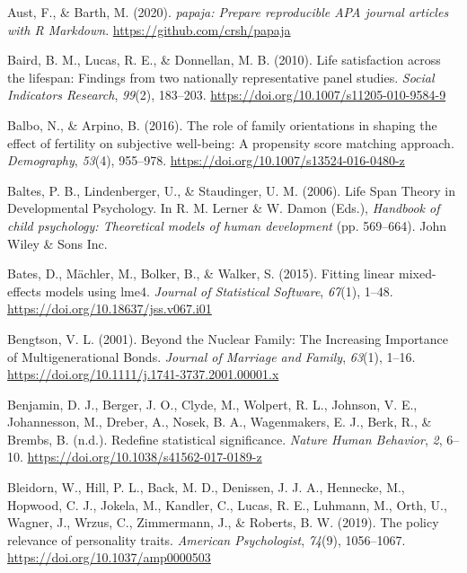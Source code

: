 \documentclass[
  english,
  man, noextraspace]{apa7}
\begin{document}
\leavevmode\hypertarget{ref-R-papaja}{}%
Aust, F., \& Barth, M. (2020). \emph{papaja: Prepare reproducible APA journal articles with R Markdown}. \url{https://github.com/crsh/papaja}

\leavevmode\hypertarget{ref-bairdLifeSatisfactionLifespan2010}{}%
Baird, B. M., Lucas, R. E., \& Donnellan, M. B. (2010). Life satisfaction across the lifespan: Findings from two nationally representative panel studies. \emph{Social Indicators Research}, \emph{99}(2), 183--203. \url{https://doi.org/10.1007/s11205-010-9584-9}

\leavevmode\hypertarget{ref-balboRoleFamilyOrientations2016}{}%
Balbo, N., \& Arpino, B. (2016). The role of family orientations in shaping the effect of fertility on subjective well-being: A propensity score matching approach. \emph{Demography}, \emph{53}(4), 955--978. \url{https://doi.org/10.1007/s13524-016-0480-z}

\leavevmode\hypertarget{ref-baltesLifeSpanTheory2006}{}%
Baltes, P. B., Lindenberger, U., \& Staudinger, U. M. (2006). Life Span Theory in Developmental Psychology. In R. M. Lerner \& W. Damon (Eds.), \emph{Handbook of child psychology: Theoretical models of human development} (pp. 569--664). John Wiley \& Sons Inc.

\leavevmode\hypertarget{ref-R-lme4}{}%
Bates, D., Mächler, M., Bolker, B., \& Walker, S. (2015). Fitting linear mixed-effects models using lme4. \emph{Journal of Statistical Software}, \emph{67}(1), 1--48. \url{https://doi.org/10.18637/jss.v067.i01}

\leavevmode\hypertarget{ref-bengtsonNuclearFamilyIncreasing2001}{}%
Bengtson, V. L. (2001). Beyond the Nuclear Family: The Increasing Importance of Multigenerational Bonds. \emph{Journal of Marriage and Family}, \emph{63}(1), 1--16. \url{https://doi.org/10.1111/j.1741-3737.2001.00001.x}

\leavevmode\hypertarget{ref-benjaminRedefineStatisticalSignificance2018}{}%
Benjamin, D. J., Berger, J. O., Clyde, M., Wolpert, R. L., Johnson, V. E., Johannesson, M., Dreber, A., Nosek, B. A., Wagenmakers, E. J., Berk, R., \& Brembs, B. (n.d.). Redefine statistical significance. \emph{Nature Human Behavior}, \emph{2}, 6--10. \url{https://doi.org/10.1038/s41562-017-0189-z}

\leavevmode\hypertarget{ref-bleidornPolicyRelevancePersonality2019}{}%
Bleidorn, W., Hill, P. L., Back, M. D., Denissen, J. J. A., Hennecke, M., Hopwood, C. J., Jokela, M., Kandler, C., Lucas, R. E., Luhmann, M., Orth, U., Wagner, J., Wrzus, C., Zimmermann, J., \& Roberts, B. W. (2019). The policy relevance of personality traits. \emph{American Psychologist}, \emph{74}(9), 1056--1067. \url{https://doi.org/10.1037/amp0000503}
\end{document}
